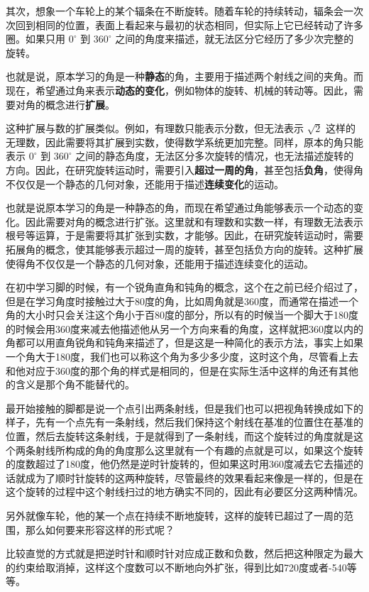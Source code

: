 其次，想象一个车轮上的某个辐条在不断旋转。随着车轮的持续转动，辐条会一次次回到相同的位置，表面上看起来与最初的状态相同，但实际上它已经转动了许多圈。如果只用 $0^\circ$ 到 $360^\circ$ 之间的角度来描述，就无法区分它经历了多少次完整的旋转。

也就是说，原本学习的角是一种\textbf{静态}的角，主要用于描述两个射线之间的夹角。而现在，希望通过角来表示\textbf{动态的变化}，例如物体的旋转、机械的转动等。因此，需要对角的概念进行\textbf{扩展}。

这种扩展与数的扩展类似。例如，有理数只能表示分数，但无法表示 $\sqrt{2}$ 这样的无理数，因此需要将其扩展到实数，使得数学系统更加完整。同样，原本的角只能表示 $0^\circ$ 到 $360^\circ$ 之间的静态角度，无法区分多次旋转的情况，也无法描述旋转的方向。因此，在研究旋转运动时，需要引入\textbf{超过一周的角}，甚至包括\textbf{负角}，使得角不仅仅是一个静态的几何对象，还能用于描述\textbf{连续变化}的运动。


也就是说原本学习的角是一种静态的角，而现在希望通过角能够表示一个动态的变化。因此需要对角的概念进行扩张。这里就和有理数和实数一样，有理数无法表示根号等运算，于是需要将其扩张到实数，才能够。因此，在研究旋转运动时，需要拓展角的概念，使其能够表示超过一周的旋转，甚至包括负方向的旋转。这种扩展使得角不仅仅是一个静态的几何对象，还能用于描述连续变化的运动。

在初中学习脚的时候，有一个锐角直角和钝角的概念，这个在之前已经介绍过了，但是在学习角度时接触过大于80度的角，比如周角就是360度，而通常在描述一个角的大小时只会关注这个角小于百80度的部分，所以有的时候当一个脚大于180度的时候会用360度来减去他描述他从另一个方向来看的角度，这样就把360度以内的角都可以用直角锐角和钝角来描述了，但是这是一种简化的表示方法，事实上如果一个角大于180度，我们也可以称这个角为多少多少度，这时这个角，尽管看上去和他对应于360度的那个角的样式是相同的，但是在实际生活中这样的角还有其他的含义是那个角不能替代的。

最开始接触的脚都是说一个点引出两条射线，但是我们也可以把视角转换成如下的样子，先有一个点先有一条射线，然后我们保持这个射线在基准的位置住在基准的位置，然后去旋转这条射线，于是就得到了一条射线，而这个旋转过的角度就是这个两条射线所构成的角的角度那么这里就有一个有趣的点就是可以，如果这个旋转的度数超过了180度，他仍然是逆时针旋转的，但如果这时用360度减去它去描述的话就成为了顺时针旋转的这两种旋转，尽管最终的效果看起来像是一样的，但是在这个旋转的过程中这个射线扫过的地方确实不同的，因此有必要区分这两种情况。

另外就像车轮，他的某一个点在持续不断地旋转，这样的旋转已超过了一周的范围，那么如何要来形容这样的形式呢？

比较直觉的方式就是把逆时针和顺时针对应成正数和负数，然后把这种限定为最大的约束给取消掉，这样这个度数可以不断地向外扩张，得到比如720度或者-540等等。

